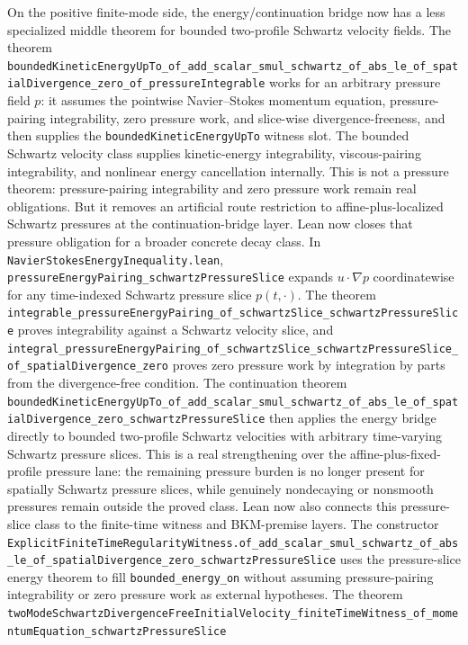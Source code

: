 \documentclass[11pt]{article}
\begin{document}
On the positive finite-mode side, the energy/continuation bridge now has a
less specialized middle theorem for bounded two-profile Schwartz velocity
fields.  The theorem
\texttt{boundedKineticEnergyUpTo\_of\_add\_scalar\_smul\_schwartz\_of\_abs\_le\_of\_spatialDivergence\_zero\_of\_pressureIntegrable}
works for an arbitrary pressure field \(p\): it assumes the pointwise
Navier--Stokes momentum equation, pressure-pairing integrability, zero
pressure work, and slice-wise divergence-freeness, and then supplies the
\texttt{boundedKineticEnergyUpTo} witness slot.  The bounded Schwartz velocity
class supplies kinetic-energy integrability, viscous-pairing integrability, and
nonlinear energy cancellation internally.  This is not a pressure theorem:
pressure-pairing integrability and zero pressure work remain real obligations.
But it removes an artificial route restriction to affine-plus-localized
Schwartz pressures at the continuation-bridge layer.
Lean now closes that pressure obligation for a broader concrete decay class.
In \texttt{NavierStokesEnergyInequality.lean},
\texttt{pressureEnergyPairing\_schwartzPressureSlice} expands
\(u\cdot\nabla p\) coordinatewise for any time-indexed Schwartz pressure slice
\(p(t,\cdot)\).  The theorem
\texttt{integrable\_pressureEnergyPairing\_of\_schwartzSlice\_schwartzPressureSlice}
proves integrability against a Schwartz velocity slice, and
\texttt{integral\_pressureEnergyPairing\_of\_schwartzSlice\_schwartzPressureSlice\_of\_spatialDivergence\_zero}
proves zero pressure work by integration by parts from the divergence-free
condition.  The continuation theorem
\texttt{boundedKineticEnergyUpTo\_of\_add\_scalar\_smul\_schwartz\_of\_abs\_le\_of\_spatialDivergence\_zero\_schwartzPressureSlice}
then applies the energy bridge directly to bounded two-profile Schwartz
velocities with arbitrary time-varying Schwartz pressure slices.  This is a
real strengthening over the affine-plus-fixed-profile pressure lane: the
remaining pressure burden is no longer present for spatially Schwartz pressure
slices, while genuinely nondecaying or nonsmooth pressures remain outside the
proved class.
Lean now also connects this pressure-slice class to the finite-time witness and
BKM-premise layers.  The constructor
\texttt{ExplicitFiniteTimeRegularityWitness.of\_add\_scalar\_smul\_schwartz\_of\_abs\_le\_of\_spatialDivergence\_zero\_schwartzPressureSlice}
uses the pressure-slice energy theorem to fill \texttt{bounded\_energy\_on}
without assuming pressure-pairing integrability or zero pressure work as
external hypotheses.  The theorem
\texttt{twoModeSchwartzDivergenceFreeInitialVelocity\_finiteTimeWitness\_of\_momentumEquation\_schwartzPressureSlice}
\end{document}
